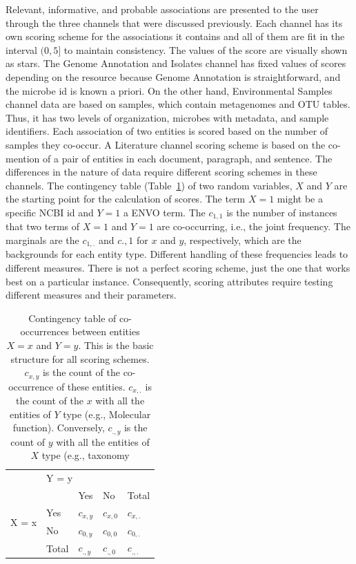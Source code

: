 Relevant, informative, and probable associations are presented to the user through the three channels that were discussed previously. 
Each channel has its own scoring scheme for the associations it contains and all of them are fit in the interval $(0,5]$ to maintain consistency. 
The values of the score are visually shown as stars. 
The Genome Annotation and Isolates channel has fixed values of scores depending on the resource because Genome Annotation is straightforward, and the microbe id is known a priori. 
On the other hand, Environmental Samples channel data are based on samples, which contain metagenomes and OTU tables. 
Thus, it has two levels of organization, microbes with metadata, and sample identifiers. Each association of two entities is scored based on the number of samples they co-occur. 
A Literature channel scoring scheme is based on the co-mention of a pair of entities in each document, paragraph, and sentence. The differences in the nature of data require different scoring schemes in these channels.
The contingency table (Table~\ref{table:pregoA1}) of two random variables, $X$ and $Y$ are the starting point for the calculation of scores. The term $X = 1$ might be a specific NCBI id and $Y = 1$ a ENVO term. 
The $c_{1,1}$ is the number of instances that two terms of $X = 1$ and $Y = 1$ are co-occurring, i.e., the joint frequency. 
The marginals are the $c_{1,.}$ and $c{.,1}$ for $x$ and $y$, respectively, which are the backgrounds for each entity type. 
Different handling of these frequencies leads to different measures. 
There is not a perfect scoring scheme, just the one that works best on a particular instance. 
Consequently, scoring attributes require testing different measures and their parameters.



\begin{table}[ht]
   \centering
   \begin{tabular}{c|llll}
    & \multicolumn{4}{l}{Y = y} \\ \cline{2-5} 
   \multirow{4}{*}{X = x} &  & Yes & No & Total \\ \cline{3-5} 
    & \multicolumn{1}{l|}{Yes} & $c_{x,y}$ & $c_{x,0}$ & $c_{x,.}$ \\
    & \multicolumn{1}{l|}{No} & $c_{0,y}$ & $c_{0,0}$ & $c_{0,.}$ \\
    & \multicolumn{1}{l|}{Total} & $c_{.,y}$ & $c_{.,0}$ & $c_{.,.}$
   \end{tabular}
   \caption[PREGO contingency table between two terms]{Contingency table of co-occurrences between entities $X = x$ and $Y = y$. 
   This is the basic structure for all scoring schemes. $c_{x,y}$ is the count of the co-occurrence of these entities. $c_{x,.}$ is the count of the $x$ with all the entities of $Y$ type (e.g., Molecular function). Conversely, $c_{.,y}$ is the count of $y$ with all the entities of $X$ type (e.g., taxonomy}
   \label{table:pregoA1}
\end{table}


